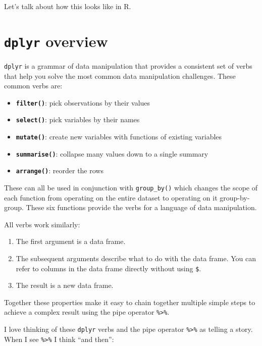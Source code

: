 \documentclass[]{book}
\providecommand{\tightlist}{%
  \setlength{\itemsep}{0pt}\setlength{\parskip}{0pt}}
\begin{document}
Let's talk about how this looks like in R.

\hypertarget{dplyr-overview}{%
\section{\texorpdfstring{\texttt{dplyr} overview}{dplyr overview}}\label{dplyr-overview}}

\texttt{dplyr} is a grammar of data manipulation that provides a consistent set of verbs that help you solve the most common data manipulation challenges. These common verbs are:

\begin{itemize}
\item
  \textbf{\texttt{filter()}}: pick observations by their values
\item
  \textbf{\texttt{select()}}: pick variables by their names
\item
  \textbf{\texttt{mutate()}}: create new variables with functions of existing variables
\item
  \textbf{\texttt{summarise()}}: collapse many values down to a single summary
\item
  \textbf{\texttt{arrange()}}: reorder the rows
\end{itemize}

These can all be used in conjunction with \texttt{group\_by()} which changes the scope of each function from operating on the entire dataset to operating on it group-by-group. These six functions provide the verbs for a language of data manipulation.

All verbs work similarly:

\begin{enumerate}
\def\labelenumi{\arabic{enumi}.}
\tightlist
\item
  The first argument is a data frame.
\item
  The subsequent arguments describe what to do with the data frame. You can refer to columns in the data frame directly without using \texttt{\$}.
\item
  The result is a new data frame.
\end{enumerate}

Together these properties make it easy to chain together multiple simple steps to achieve a complex result using the pipe operator \texttt{\%\textgreater{}\%}.

I love thinking of these \texttt{dplyr} verbs and the pipe operator \texttt{\%\textgreater{}\%} as telling a story. When I see \texttt{\%\textgreater{}\%} I think ``and then'':
\end{document}
